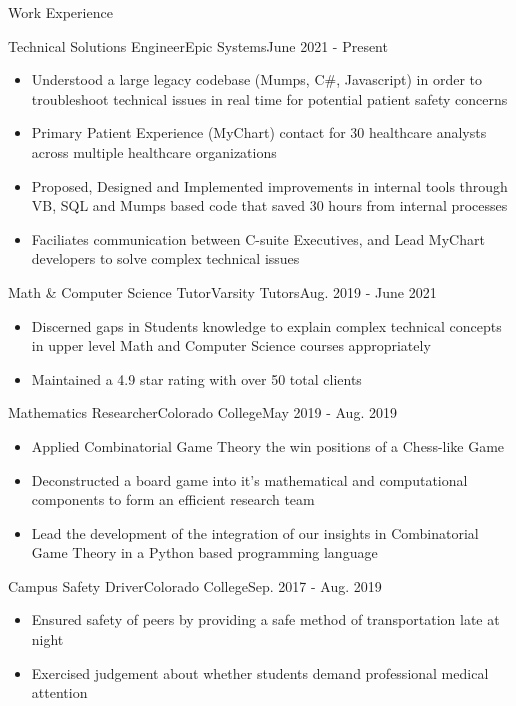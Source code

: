 \begin{cvsection}{Work Experience}
	\begin{cvsubsection}{Technical Solutions Engineer}{Epic Systems}{June 2021 - Present}			
		\begin{itemize}
			\item Understood a large legacy codebase (Mumps, C\#, Javascript) in order to troubleshoot technical issues in real time for potential patient safety concerns
			\item Primary Patient Experience (MyChart) contact for 30 healthcare analysts across multiple healthcare organizations
			\item Proposed, Designed and Implemented improvements in internal tools through VB, SQL and Mumps based code that saved 30 hours from internal processes
			\item Faciliates communication between C-suite Executives, and Lead MyChart developers to solve complex technical issues
		\end{itemize}
	\end{cvsubsection}
	
	\begin{cvsubsection}{Math \& Computer Science Tutor}{Varsity Tutors}{Aug. 2019 - June 2021}	
		\begin{itemize}
			\item Discerned gaps in Students knowledge to explain complex technical concepts in upper level Math and Computer Science courses appropriately
			\item Maintained a 4.9 star rating with over 50 total clients
		\end{itemize}
	\end{cvsubsection}
	
	\begin{cvsubsection}{Mathematics Researcher}{Colorado College}{May 2019 - Aug. 2019}
	\begin{itemize}
		\item Applied Combinatorial Game Theory the win positions of a Chess-like Game
		\item Deconstructed a board game into it’s mathematical and computational components to form an efficient research team
		\item Lead the development of the integration of our insights in Combinatorial Game Theory in a Python based programming language
		\end{itemize}
	\end{cvsubsection}
	
		\begin{cvsubsection}{Campus Safety Driver}{Colorado College}{Sep. 2017 - Aug. 2019}
	\begin{itemize}
		\item Ensured safety of peers by providing a safe method of transportation late at night
		\item Exercised judgement about whether students demand professional medical attention
		\end{itemize}
	\end{cvsubsection}
	
\end{cvsection}



